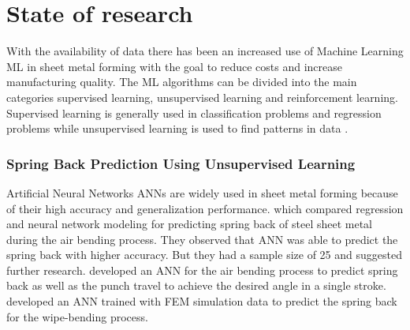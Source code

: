 
\section{State of research}

With the availability of data there has been an increased use of Machine Learning \ac{ML} in sheet metal forming with the goal to reduce costs and increase manufacturing quality.
\cite{bock_reviewapplicationmachine_2019} \cite[]{cao_manufacturingadvancedsmart_2019} %
The ML algorithms can be divided into the main categories supervised learning, unsupervised learning and reinforcement learning. \cite[]{liu_reinforcementlearningfreeform_2020}
Supervised learning is generally used in classification problems and regression problems while unsupervised learning is used to find patterns in data \cite[p. 2]{cruz_applicationmachinelearning_2021}.

\subsubsection*{Spring Back Prediction Using Unsupervised Learning}
Artificial Neural Networks \ac{ANN}s are widely used in sheet metal forming because of their high accuracy and generalization performance. \cite[p. 2]{cruz_applicationmachinelearning_2021} \cite[]{narayanasamy_comparisonregressionartificial_2012a} which compared regression and neural network modeling for predicting spring back of steel sheet metal during the air bending process.  
They observed that ANN was able to predict the spring back with higher accuracy. But they had a sample size of 25 and suggested further research. 
\cite[]{inamdar_developmentartificialneural_2000} developed an ANN for the air bending process to predict spring back as well as the punch travel to achieve the desired angle in a single stroke.
\cite[]{kazan_predictionspringbackwipebending_2009} developed an ANN trained with FEM simulation data to predict the spring back for the wipe-bending process.



